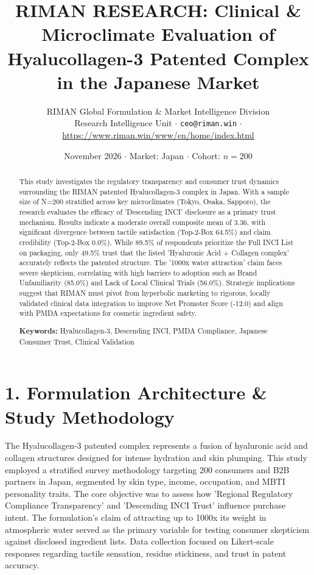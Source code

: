 \documentclass[10pt,twocolumn,a4paper]{article}
\title{\textbf{RIMAN RESEARCH: Clinical \& Microclimate Evaluation of Hyalucollagen-3 Patented Complex in the Japanese Market}}
\author{RIMAN Global Formulation \& Market Intelligence Division\\
\small Research Intelligence Unit $\cdot$ \texttt{ceo@riman.win} $\cdot$ \url{https://www.riman.win/www/en/home/index.html}}
\date{November 2026 \quad $\cdot$ \quad Market: Japan \quad $\cdot$ \quad Cohort: $n = 200$}
\begin{document}
\maketitle

\begin{abstract}
This study investigates the regulatory transparency and consumer trust dynamics surrounding the RIMAN patented Hyalucollagen-3 complex in Japan. With a sample size of N=200 stratified across key microclimates (Tokyo, Osaka, Sapporo), the research evaluates the efficacy of 'Descending INCI' disclosure as a primary trust mechanism. Results indicate a moderate overall composite mean of 3.36, with significant divergence between tactile satisfaction (Top-2-Box 64.5\%) and claim credibility (Top-2-Box 0.0\%). While 89.5\% of respondents prioritize the Full INCI List on packaging, only 49.5\% trust that the listed 'Hyaluronic Acid + Collagen complex' accurately reflects the patented structure. The '1000x water attraction' claim faces severe skepticism, correlating with high barriers to adoption such as Brand Unfamiliarity (85.0\%) and Lack of Local Clinical Trials (56.0\%). Strategic implications suggest that RIMAN must pivot from hyperbolic marketing to rigorous, locally validated clinical data integration to improve Net Promoter Score (-12.0) and align with PMDA expectations for cosmetic ingredient safety.

\vspace{0.4em}
\noindent\textbf{Keywords:} Hyalucollagen-3, Descending INCI, PMDA Compliance, Japanese Consumer Trust, Clinical Validation
\end{abstract}

\section{1. Formulation Architecture \& Study Methodology}
The Hyalucollagen-3 patented complex represents a fusion of hyaluronic acid and collagen structures designed for intense hydration and skin plumping. This study employed a stratified survey methodology targeting 200 consumers and B2B partners in Japan, segmented by skin type, income, occupation, and MBTI personality traits. The core objective was to assess how 'Regional Regulatory Compliance Transparency' and 'Descending INCI Trust' influence purchase intent. The formulation's claim of attracting up to 1000x its weight in atmospheric water served as the primary variable for testing consumer skepticism against disclosed ingredient lists. Data collection focused on Likert-scale responses regarding tactile sensation, residue stickiness, and trust in patent accuracy.
\end{document}
